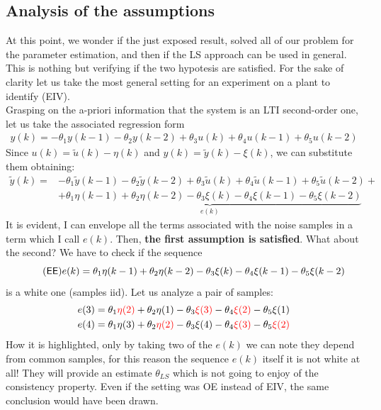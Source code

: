 \subsection{Analysis of the assumptions}
At this point, we wonder if the just exposed result, solved all of our problem for the parameter estimation, and then if the LS approach can be used in general. This is nothing but verifying if the two hypotesis are satisfied. For the sake of clarity let us take the most general setting for an experiment on a plant to identify (EIV).\\
Grasping on the a-priori information that the system is an LTI second-order one, let us take the associated regression form
\begin{equation*}
    \begin{aligned}
        y(k)=-\theta_1{y(k-1)}-\theta_2{y(k-2)}+\theta_3{u(k)}+\theta_4{u(k-1)}+\theta_5{u(k-2)} 
    \end{aligned}
\end{equation*}
Since $u(k)=\tilde{u}(k)-\eta(k)$ and ${y}(k)=\tilde{y}(k)-\xi(k)$, we can substitute them obtaining:
\begin{equation}
    \begin{aligned} \label{eq:ee_equation}
    \tilde{y}(k)=&-\theta_1{\tilde{y}(k-1)}-\theta_2{\tilde{y}(k-2)}+\theta_3{\tilde{u}(k)}+\theta_4{\tilde{u}(k-1)}+\theta_5{\tilde{u}(k-2)}+\\
    &\underbrace{+\theta_1{\eta(k-1)}+\theta_2{\eta(k-2)}-\theta_3{\xi(k)}-\theta_4{\xi(k-1)}-\theta_5{\xi(k-2)}}_{e(k)}
\end{aligned}
\end{equation}
It is evident, I can envelope all the terms associated with the noise samples in a term which I call $e(k)$. Then, \textbf{the first assumption is satisfied}. What about the second? We have to check if the sequence 
\begin{equation}\label{eq:EquationError} \tag{\textsf{EE}}
    {e(k)}=\theta_1{\eta(k-1)}+\theta_2{\eta(k-2)}-\theta_3{\xi(k)}-\theta_4{\xi(k-1)}-\theta_5{\xi(k-2)}
\end{equation}
is a white one (samples iid). Let us analyze a pair of samples:
\begin{align*}
    e(3)=\theta_1{\color{red}\eta(2)}+\theta_2\eta(1)-\theta_3{\color{red}\xi(3)}-\theta_4{\color{red}\xi(2)} -\theta_5\xi(1)\\
    e(4)=\theta_1{\eta(3)}+\theta_2{\color{red}\eta(2)}-\theta_3\xi(4)-\theta_4{\color{red}\xi(3)} -\theta_5{\color{red}\xi(2)}\\
\end{align*}
How it is highlighted, only by taking two of the $e(k)$ we can note they depend from common samples, for this reason the sequence $e(k)$ itself it is not white at all! They will provide an estimate $\theta_{LS}$ which is not going to enjoy of the consistency property. Even if the setting was OE instead of EIV, the same conclusion would have been drawn.

